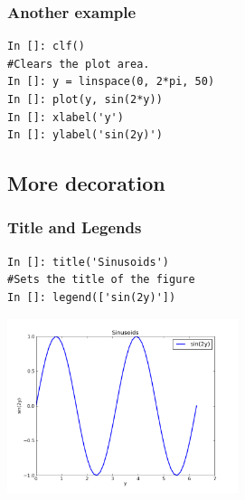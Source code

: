 \documentclass[14pt,compress]{beamer}
\begin{document}
\begin{frame}[fragile]
\frametitle{Another example}
  \begin{lstlisting}
In []: clf()
#Clears the plot area.
In []: y = linspace(0, 2*pi, 50)
In []: plot(y, sin(2*y))
In []: xlabel('y')
In []: ylabel('sin(2y)')
  \end{lstlisting}
\end{frame}

\subsection{More decoration}
\begin{frame}[fragile]
\frametitle{Title and Legends}
\vspace*{-0.15in}
\begin{lstlisting}
In []: title('Sinusoids')
#Sets the title of the figure
In []: legend(['sin(2y)'])
\end{lstlisting}
  \vspace*{-0.1in}
  \begin{center}
  \includegraphics[height=2in, interpolate=true]{data/legend}  
  \end{center}
\end{frame}
\end{document}
